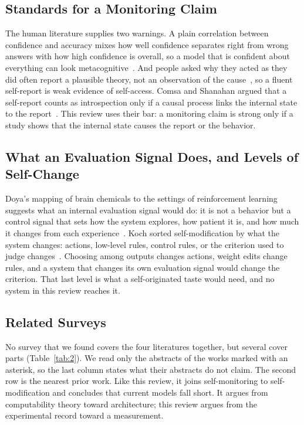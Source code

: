 \documentclass[journal]{IEEEtran}
\begin{document}
\subsection{Standards for a Monitoring Claim}\label{sec:2.2}

The human literature supplies two warnings. A plain correlation between confidence and accuracy mixes how well confidence separates right from wrong answers with how high confidence is overall, so a model that is confident about everything can look metacognitive~\cite{Fleming2014}. And people asked why they acted as they did often report a plausible theory, not an observation of the cause~\cite{Nisbett1977}, so a fluent self-report is weak evidence of self-access. Comsa and Shanahan argued that a self-report counts as introspection only if a causal process links the internal state to the report~\cite{Comsa2025}. This review uses their bar: a monitoring claim is strong only if a study shows that the internal state causes the report or the behavior.

\subsection{What an Evaluation Signal Does, and Levels of Self-Change}\label{sec:2.3}

Doya's mapping of brain chemicals to the settings of reinforcement learning suggests what an internal evaluation signal would do: it is not a behavior but a control signal that sets how the system explores, how patient it is, and how much it changes from each experience~\cite{Doya2002}. Koch sorted self-modification by what the system changes: actions, low-level rules, control rules, or the criterion used to judge changes~\cite{Koch2026}. Choosing among outputs changes actions, weight edits change rules, and a system that changes its own evaluation signal would change the criterion. That last level is what a self-originated taste would need, and no system in this review reaches it.

\subsection{Related Surveys}\label{sec:2.4}

No survey that we found covers the four literatures together, but several cover parts (Table~\ref{tab:2}). We read only the abstracts of the works marked with an asterisk, so the last column states what their abstracts do not claim. The second row is the nearest prior work. Like this review, it joins self-monitoring to self-modification and concludes that current models fall short. It argues from computability theory toward architecture; this review argues from the experimental record toward a measurement.
\end{document}
